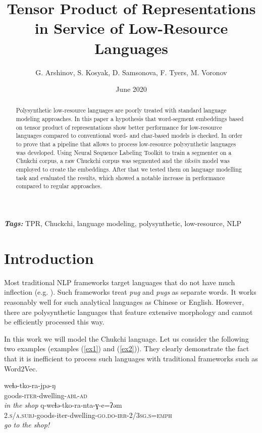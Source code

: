 \documentclass[leqno]{article}
\title{Tensor Product of Representations in Service of Low-Resource Languages}
\author{G. Arshinov, S. Kosyak, D. Samsonova, F. Tyers, M. Voronov}
\date{June 2020}
\providecommand{\keywords}[1]{\textbf{\textit{Tags: }} #1}
\begin{document}
\maketitle

\begin{abstract}
Polysynthetic low-resource languages are poorly treated with standard language modeling approaches. In this paper a hypothesis that word-segment embeddings based on tensor product of representations show better performance for low-resource languages compared to conventional word- and char-based models is checked. In order to prove that a pipeline that allows to process low-resource polysynthetic languages was developed. Using Neural Sequence Labeling Toolkit \parencite{yang2018ncrf} to train a segmenter on a Chukchi corpus, a raw Chuckchi corpus was segmented and the \textit{iiksiin} \parencite{iiksiin} model was employed to create the embeddings. After that we tested them on language modelling task and evaluated the results, which showed a notable increase in performance compared to regular approaches.
\end{abstract}

\keywords{TPR, Chuckchi, language modeling, polysynthetic, low-resource, NLP} 

\section{Introduction}

Most traditional NLP frameworks target languages that do not have
much inflection (e.g. \parencite{word2vec}).
Such frameworks treat \textit{pug} and \textit{pugs} as separate words. It works reasonably well for such analytical languages as Chinese or English. However, there are polysynthetic languages that feature extensive
morphology and cannot be efficiently processed this way.

In this work we will model the Chukchi language. Let us consider the following two examples
(examples (\ref{ex1}) and (\ref{ex2})). They clearly demonstrate the fact
that it is inefficient to process such languages with traditional frameworks
such as Word2Vec.

\begin{exe}
    \ex \label{ex1}
    \gll weɬə-tko-ra-jpə-ŋ \\
    goods-\textsc{iter}-dwelling-\textsc{abl}-\textsc{ad}\\
    \glt \textit{in the shop}
    \ex \label{ex2}
    \gll q-weɬə-tko-ra-nta-ɣ-e=ʔəm \\
    \textsc{2.s/a.subj}-goods-{iter}-dwelling-\textsc{go.do-irr-2/3sg.s=emph} \\
    \glt \textit{go to the shop!}
\end{exe}
\end{document}
